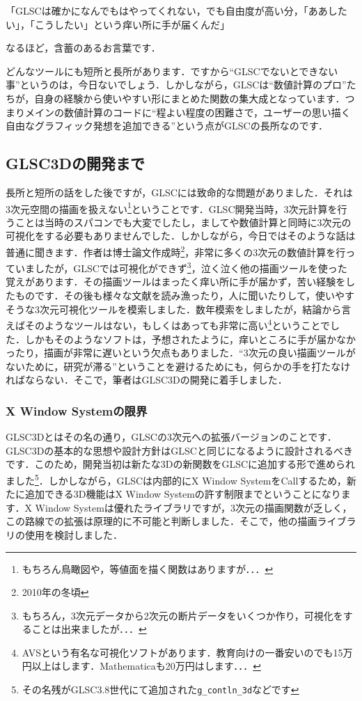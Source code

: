 \documentclass[a4paper,12pt]{jsarticle}%
\begin{document}
\noindent
「GLSCは確かになんでもはやってくれない，でも自由度が高い分，「ああしたい」，「こうしたい」という痒い所に手が届くんだ」

\noindent
なるほど，含蓄のあるお言葉です．

どんなツールにも短所と長所があります．ですから``GLSCでないとできない事''というのは，今日ないでしょう．しかしながら，GLSCは``数値計算のプロ''たちが，自身の経験から使いやすい形にまとめた関数の集大成となっています．つまりメインの数値計算のコードに``程よい程度の困難さで，ユーザーの思い描く自由なグラフィック発想を追加できる''という点がGLSCの長所なのです．
\subsection{GLSC3Dの開発まで}

長所と短所の話をした後ですが，GLSCには致命的な問題がありました．それは3次元空間の描画を扱えない\footnote{もちろん鳥瞰図や，等値面を描く関数はありますが．．．}ということです．GLSC開発当時，3次元計算を行うことは当時のスパコンでも大変でしたし，ましてや数値計算と同時に3次元の可視化をする必要もありませんでした．しかしながら，今日ではそのような話は普通に聞きます．作者は博士論文作成時\footnote{2010年の冬頃}，非常に多くの3次元の数値計算を行っていましたが，GLSCでは可視化ができず\footnote{もちろん，3次元データから2次元の断片データをいくつか作り，可視化をすることは出来ましたが．．．}，泣く泣く他の描画ツールを使った覚えがあります．その描画ツールはまったく痒い所に手が届かず，苦い経験をしたものです．その後も様々な文献を読み漁ったり，人に聞いたりして，使いやすそうな3次元可視化ツールを模索しました．数年模索をしましたが，結論から言えばそのようなツールはない，もしくはあっても非常に高い\footnote{AVSという有名な可視化ソフトがあります．教育向けの一番安いのでも15万円以上はします．Mathematicaも20万円はします．．．}ということでした．しかもそのようなソフトは，予想されたように，痒いところに手が届かなかったり，描画が非常に遅いという欠点もありました．``3次元の良い描画ツールがないために，研究が滞る''ということを避けるためにも，何らかの手を打たなければならない．そこで，筆者はGLSC3Dの開発に着手しました．

\subsubsection{X Window Systemの限界}
GLSC3Dとはその名の通り，GLSCの3次元への拡張バージョンのことです．GLSC3Dの基本的な思想や設計方針はGLSCと同じになるように設計されるべきです．このため，開発当初は新たな3Dの新関数をGLSCに追加する形で進められました\footnote{その名残がGLSC3.8世代にて追加された\verb|g_contln_3d|などです}．しかしながら，GLSCは内部的にX Window SystemをCallするため，新たに追加できる3D機能はX Window Systemの許す制限までということになります．X Window Systemは優れたライブラリですが，3次元の描画関数が乏しく，この路線での拡張は原理的に不可能と判断しました．そこで，他の描画ライブラリの使用を検討しました．
\end{document}
